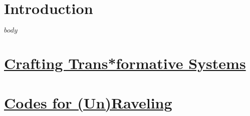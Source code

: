 \documentclass[11pt,oneside]{scrbook} %
\begin{document}
\newpage
%
\setcounter{page}{1}

\chapter{Introduction}

$body$
% 

\newpage












\chapter{\href{https://coding.care/critintro.html}{Crafting Trans*formative Systems}}

\chapter{\href{https://coding.care/unraveling.html}{Codes for (Un)Raveling}}
\end{document}
